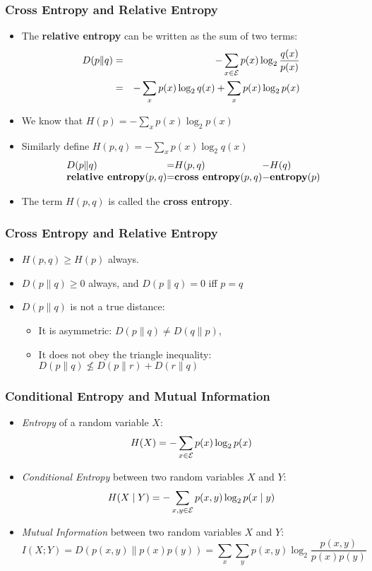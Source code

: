 \begin{frame}
\frametitle{Cross Entropy and Relative Entropy}
\begin{itemize}[<+->]
\item The {\bf relative entropy} can be written as the sum of two terms:
\begin{eqnarray*}
D(p \| q) & = & - \sum_{x \in {\cal E}} p(x) \log_2 \frac{q(x)}{p(x)} \\
& = & - \sum_{x} p(x) \log_2 q(x) + \sum_{x} p(x) \log_2 p(x) 
\end{eqnarray*}
\item We know that $H(p) = - \sum_{x} p(x) \log_2 p(x)$
\item Similarly define $H(p,q) = - \sum_{x} p(x) \log_2 q(x)$
\[
\begin{array}{l@{}c@{}l@{}c@{}l@{}}
D(p \| q) & = & H(p,q) & - & H(q) \\
\textbf{relative entropy}(p,q) & = & \textbf{cross entropy}(p,q) & - & \textbf{entropy}(p) 
\end{array}
\]
\item The term $H(p,q)$ is called the {\bf cross entropy}.
\end{itemize}

\end{frame}

\begin{frame}
\frametitle{Cross Entropy and Relative Entropy}
\begin{itemize}[<+->]
\item $H(p,q) \geq H(p)$ always.
\item $D(p \| q) \geq 0$ always, and $D(p \| q) = 0$ iff $p = q$
\item $D(p \| q)$ is not a true distance: 
  \begin{itemize}
  \item It is asymmetric: $D(p \| q) \neq D(q \| p)$, 
  \item It does not obey the triangle inequality: $D(p \| q) \nleq D(p \| r) + D(r \| q)$
  \end{itemize}
\end{itemize}

\end{frame}

\begin{frame}
\frametitle{Conditional Entropy and Mutual Information}
\begin{itemize}[<+->]
\item {\it Entropy} of a random variable $X$:
\[ H(X) = - \sum_{x \in {\cal E}} p(x) \log_2 p(x) \]
\item {\it Conditional Entropy} between two random variables $X$ and $Y$:
\[ H(X \mid Y) = - \sum_{x,y \in {\cal E}} p(x,y) \log_2 p(x
\mid y) \]
\item {\it Mutual Information} between two random variables $X$ and $Y$:
\[ I(X;Y) = D(p(x,y) \| p(x)p(y)) = \sum_x \sum_y p(x,y) \log_2
\frac{p(x,y)}{p(x)p(y)} \]
\end{itemize}

\end{frame}

